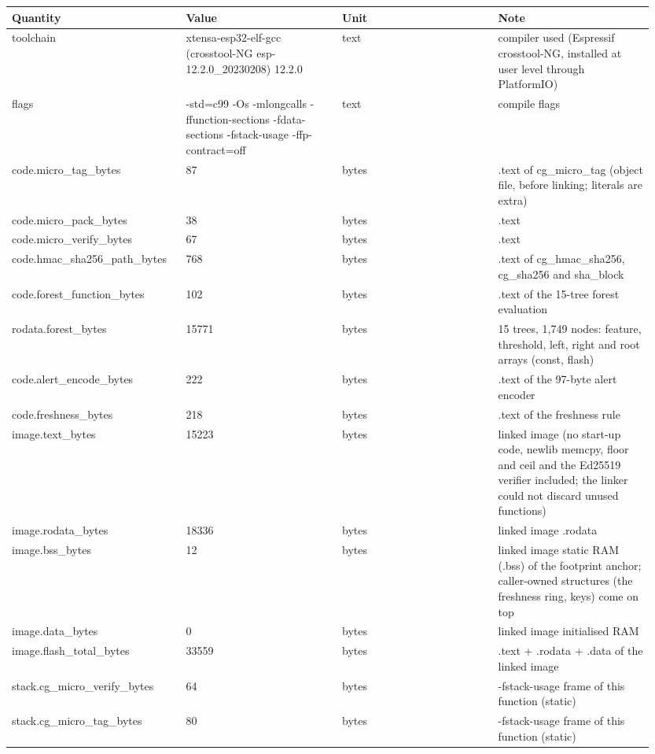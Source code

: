 {\scriptsize\raggedright
\begin{longtable}{p{0.237\linewidth}p{0.237\linewidth}p{0.237\linewidth}p{0.237\linewidth}}
\toprule
Quantity & Value & Unit & Note \\
\midrule
\endhead
toolchain & xtensa-esp32-elf-gcc (crosstool-NG esp-12.2.0\_20230208) 12.2.0 & text & compiler used (Espressif crosstool-NG, installed at user level through PlatformIO) \\
flags & -std=c99 -Os -mlongcalls -ffunction-sections -fdata-sections -fstack-usage -ffp-contract=off & text & compile flags \\
code.micro\_tag\_bytes & 87 & bytes & .text of cg\_micro\_tag (object file, before linking; literals are extra) \\
code.micro\_pack\_bytes & 38 & bytes & .text \\
code.micro\_verify\_bytes & 67 & bytes & .text \\
code.hmac\_sha256\_path\_bytes & 768 & bytes & .text of cg\_hmac\_sha256, cg\_sha256 and sha\_block \\
code.forest\_function\_bytes & 102 & bytes & .text of the 15-tree forest evaluation \\
rodata.forest\_bytes & 15771 & bytes & 15 trees, 1,749 nodes: feature, threshold, left, right and root arrays (const, flash) \\
code.alert\_encode\_bytes & 222 & bytes & .text of the 97-byte alert encoder \\
code.freshness\_bytes & 218 & bytes & .text of the freshness rule \\
image.text\_bytes & 15223 & bytes & linked image (no start-up code, newlib memcpy, floor and ceil and the Ed25519 verifier included; the linker could not discard unused functions) \\
image.rodata\_bytes & 18336 & bytes & linked image .rodata \\
image.bss\_bytes & 12 & bytes & linked image static RAM (.bss) of the footprint anchor; caller-owned structures (the freshness ring, keys) come on top \\
image.data\_bytes & 0 & bytes & linked image initialised RAM \\
image.flash\_total\_bytes & 33559 & bytes & .text + .rodata + .data of the linked image \\
stack.cg\_micro\_verify\_bytes & 64 & bytes & -fstack-usage frame of this function (static) \\
stack.cg\_micro\_tag\_bytes & 80 & bytes & -fstack-usage frame of this function (static) \\

\end{longtable}}
